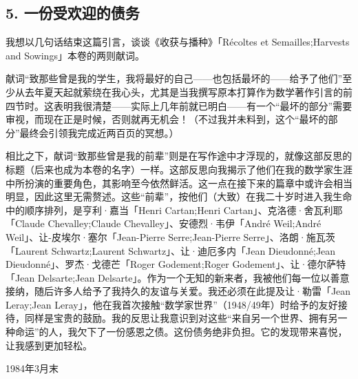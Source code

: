 \subsection{5. 一份受欢迎的债务}

我想以几句话结束这篇引言，谈谈《收获与播种》「Récoltes et Semailles;Harvests and Sowings」本卷的两则献词。

献词“致那些曾是我的学生，我将最好的自己——也包括最坏的——给予了他们”至少从去年夏天起就萦绕在我心头，尤其是当我撰写原本打算作为数学著作引言的前四节时。这表明我很清楚——实际上几年前就已明白——有一个“最坏的部分”需要审视，而现在正是时候，否则就再无机会！（不过我并未料到，这个“最坏的部分”最终会引领我完成近两百页的冥想。）

相比之下，献词“致那些曾是我的前辈”则是在写作途中才浮现的，就像这部反思的标题（后来也成为本卷的名字）一样。这部反思向我揭示了他们在我的数学家生涯中所扮演的重要角色，其影响至今依然鲜活。这一点在接下来的篇章中或许会相当明显，因此这里无需赘述。这些“前辈”，按他们（大致）在我二十岁时进入我生命中的顺序排列，是亨利·嘉当「Henri Cartan;Henri Cartan」、克洛德·舍瓦利耶「Claude Chevalley;Claude Chevalley」、安德烈·韦伊「André Weil;André Weil」、让-皮埃尔·塞尔「Jean-Pierre Serre;Jean-Pierre Serre」、洛朗·施瓦茨「Laurent Schwartz;Laurent Schwartz」、让·迪厄多内「Jean Dieudonné;Jean Dieudonné」、罗杰·戈德芒「Roger Godement;Roger Godement」、让·德尔萨特「Jean Delsarte;Jean Delsarte」。作为一个无知的新来者，我被他们每一位以善意接纳，随后许多人给予了我持久的友谊与关爱。我还必须在此提及让·勒雷「Jean Leray;Jean Leray」，他在我首次接触“数学家世界”（1948/49年）时给予的友好接待，同样是宝贵的鼓励。我的反思让我意识到对这些“来自另一个世界、拥有另一种命运”的人，我欠下了一份感恩之债。这份债务绝非负担。它的发现带来喜悦，让我感到更加轻松。

\hfill 1984年3月末